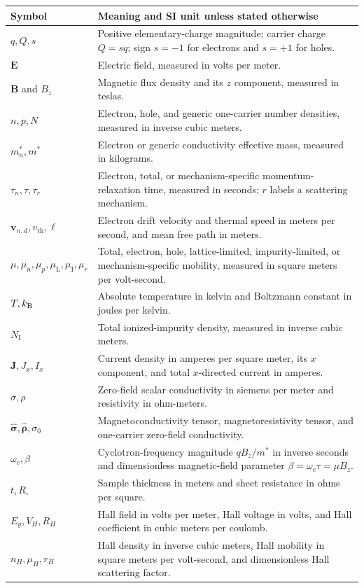 \begin{center}
\small
\begin{tabularx}{\textwidth}{@{}lX@{}}
\toprule
Symbol & Meaning and SI unit unless stated otherwise \\
\midrule
$q,Q,s$ & Positive elementary-charge magnitude; carrier charge $Q=sq$; sign $s=-1$ for electrons and $s=+1$ for holes. \\
$\bm E$ & Electric field, measured in volts per meter. \\
$\bm B$ and $B_z$ & Magnetic flux density and its $z$ component, measured in teslas. \\
$n,p,N$ & Electron, hole, and generic one-carrier number densities, measured in inverse cubic meters. \\
$m_n^*,m^*$ & Electron or generic conductivity effective mass, measured in kilograms. \\
$\tau_n,\tau,\tau_r$ & Electron, total, or mechanism-specific momentum-relaxation time, measured in seconds; $r$ labels a scattering mechanism. \\
$\bm v_{n,\mathrm d},v_{\mathrm{th}},\ell$ & Electron drift velocity and thermal speed in meters per second, and mean free path in meters. \\
$\mu,\mu_n,\mu_p,\mu_{\mathrm L},\mu_{\mathrm I},\mu_r$ & Total, electron, hole, lattice-limited, impurity-limited, or mechanism-specific mobility, measured in square meters per volt-second. \\
$T,k_{\mathrm B}$ & Absolute temperature in kelvin and Boltzmann constant in joules per kelvin. \\
$N_{\mathrm I}$ & Total ionized-impurity density, measured in inverse cubic meters. \\
$\bm J,J_x,I_x$ & Current density in amperes per square meter, its $x$ component, and total $x$-directed current in amperes. \\
$\sigma,\rho$ & Zero-field scalar conductivity in siemens per meter and resistivity in ohm-meters. \\
$\hat{\bm\sigma},\hat{\bm\rho},\sigma_0$ & Magnetoconductivity tensor, magnetoresistivity tensor, and one-carrier zero-field conductivity. \\
$\omega_c,\beta$ & Cyclotron-frequency magnitude $qB_z/m^*$ in inverse seconds and dimensionless magnetic-field parameter $\beta=\omega_c\tau=\mu B_z$. \\
$t,R_{\square}$ & Sample thickness in meters and sheet resistance in ohms per square. \\
$E_y,V_H,R_H$ & Hall field in volts per meter, Hall voltage in volts, and Hall coefficient in cubic meters per coulomb. \\
$n_H,\mu_H,r_H$ & Hall density in inverse cubic meters, Hall mobility in square meters per volt-second, and dimensionless Hall scattering factor. \\
\bottomrule
\end{tabularx}
\end{center}

